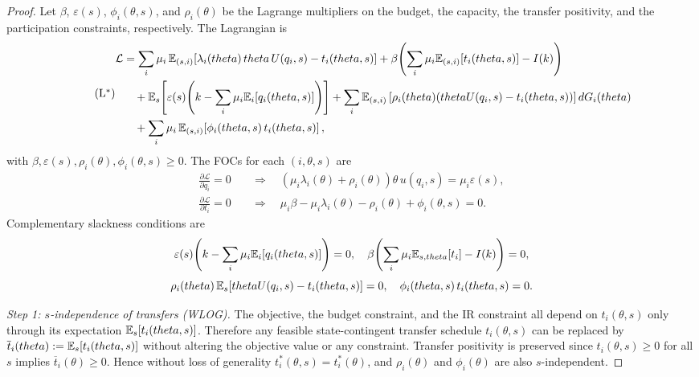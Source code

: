 \documentclass[master.tex]{subfiles}
\begin{document}
\begin{proof}
Let $\beta$, $\varepsilon(s)$, $\phi_i(\theta,s)$, and $\rho_i(\theta)$ be the Lagrange multipliers on the budget, the capacity, the transfer positivity, and the participation constraints, respectively. The Lagrangian is
\[\label{KKT}\tag{L$^*$}
\begin{aligned}
\mathcal{L} &= \sum_i \mu_i\, \mathbb{E}_{(s,i)}\!\left[\lambda_i(theta)\,theta\, U(q_i,s) - t_i(theta,s)\right] + \beta\!\left(\sum_i \mu_i \mathbb{E}_{(s,i)}[t_i(theta,s)] - I(k)\right) \\
&\quad + \mathbb{E}_s\!\left[\varepsilon(s)\!\left(k - \sum_i \mu_i \mathbb{E}_i[q_i(theta,s)]\right)\right] + \sum_i  \mathbb{E}_{(s,i)}\left[ \rho_i(theta)(theta U(q_i,s) - t_i(theta,s))\right] dG_i(theta) \\
&\quad + \sum_i \mu_i\, \mathbb{E}_{(s,i)}\!\left[\phi_i(theta,s)\,t_i(theta,s)\right],
\end{aligned}
\]
with $\beta, \varepsilon(s), \rho_i(\theta), \phi_i(\theta,s) \geq 0$. The FOCs for each $(i,\theta,s)$ are
\begin{align*}
\frac{\partial \mathcal{L}}{\partial q_i} = 0 \quad &\Rightarrow \quad \left(\mu_i\lambda_i(\theta) + \rho_i(\theta)\right)\theta\, u(q_i,s) = \mu_i\varepsilon(s), \\
\frac{\partial \mathcal{L}}{\partial t_i} = 0 \quad &\Rightarrow \quad \mu_i\beta - \mu_i\lambda_i(\theta) - \rho_i(\theta) + \phi_i(\theta,s) = 0.
\end{align*}
Complementary slackness conditions are
\[
\varepsilon(s)\!\left(k - \sum_i \mu_i \mathbb{E}_i[q_i(theta,s)]\right) = 0, \quad \beta\!\left(\sum_i \mu_i \mathbb{E}_{s,theta}[t_i] - I(k)\right) = 0,
\]
\[
\rho_i(theta)\,\mathbb{E}_s\!\left[theta U(q_i,s) - t_i(theta,s)\right] = 0, \quad \phi_i(theta,s)\,t_i(theta,s) = 0.
\]

\textit{Step 1: $s$-independence of transfers (WLOG).} The objective, the budget constraint, and the IR constraint all depend on $t_i(\theta,s)$ only through its expectation $\mathbb{E}_s[t_i(theta,s)]$. Therefore any feasible state-contingent transfer schedule $t_i(\theta,s)$ can be replaced by $\overline{t}_i(theta) := \mathbb{E}_s[t_i(theta,s)]$ without altering the objective value or any constraint. Transfer positivity is preserved since $t_i(\theta,s) \geq 0$ for all $s$ implies $\overline{t}_i(\theta) \geq 0$. Hence without loss of generality $t_i^*(\theta,s) = t_i^*(\theta)$, and $\rho_i(\theta)$ and $\phi_i(\theta)$ are also $s$-independent.


\end{proof}
\end{document}
